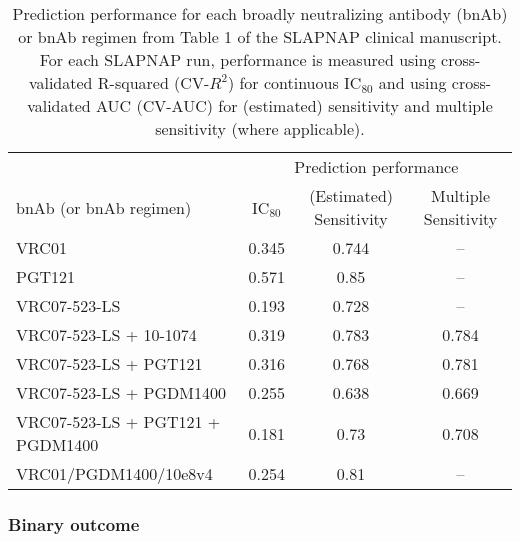 \documentclass[10pt]{article}
\begin{document}
\begin{table}
    \centering
    \caption{Prediction performance for each broadly neutralizing antibody (bnAb) or bnAb regimen from Table 1 of the SLAPNAP clinical manuscript. For each SLAPNAP run, performance is measured using cross-validated R-squared (CV-$R^2$) for continuous IC$_{80}$ and using cross-validated AUC (CV-AUC) for (estimated) sensitivity and multiple sensitivity (where applicable).}
    \begin{tabular}{l|ccc}
        & \multicolumn{3}{c}{Prediction performance} \\
        bnAb (or bnAb regimen) & IC$_{80}$ & (Estimated) Sensitivity & Multiple Sensitivity \\
        \hline
        VRC01 & 0.345 & 0.744 & -- \\
        PGT121 & 0.571 & 0.85 & -- \\
        VRC07-523-LS & 0.193 & 0.728 & --\\
        VRC07-523-LS + 10-1074 & 0.319 & 0.783 & 0.784 \\
        VRC07-523-LS + PGT121 & 0.316 & 0.768 & 0.781 \\
        VRC07-523-LS + PGDM1400 & 0.255 & 0.638 & 0.669 \\
        VRC07-523-LS + PGT121 + PGDM1400 & 0.181 & 0.73 & 0.708 \\
        VRC01/PGDM1400/10e8v4 & 0.254 & 0.81 & --
    \end{tabular}
    \label{tab:perf}
\end{table}

\subsubsection{Binary outcome}
\end{document}
